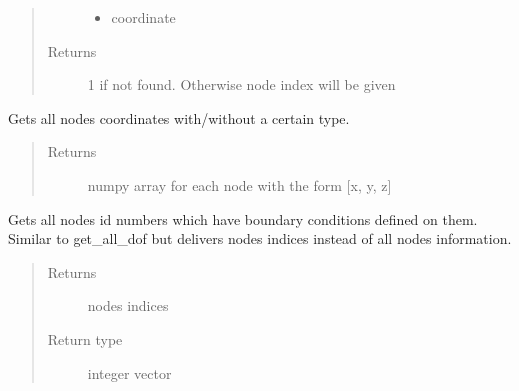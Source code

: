 \documentclass[letterpaper,10pt,english]{sphinxmanual}
\begin{document}
\begin{fulllineitems}
\begin{fulllineitems}
\begin{quote}
\begin{description}
\begin{itemize}
\item {} 
 \textendash{} coordinate

\end{itemize}

\item[{Returns}] \leavevmode
\sphinxhyphen{}1 if not found. Otherwise node index will be given

\end{description}\end{quote}

\end{fulllineitems}


\begin{fulllineitems}
\label{\detokenize{api:beamon.database.Database.get_nodes}}
Gets all nodes coordinates with/without a certain type.
\begin{quote}\begin{description}
\item[{Returns}] \leavevmode
numpy array for each node with the form {[}x, y, z{]}

\end{description}\end{quote}

\end{fulllineitems}


\begin{fulllineitems}
\label{\detokenize{api:beamon.database.Database.get_nodes_indexes_with_bc}}
Gets all nodes id numbers which have boundary conditions defined on them. Similar to get\_all\_dof but delivers
nodes indices instead of all nodes information.
\begin{quote}\begin{description}
\item[{Returns}] \leavevmode
nodes indices

\item[{Return type}] \leavevmode
integer vector


\end{description}
\end{quote}
\end{fulllineitems}
\end{fulllineitems}
\end{document}
